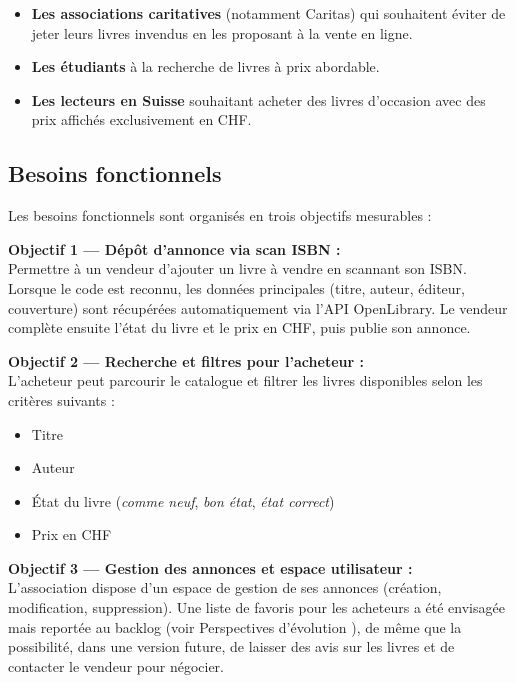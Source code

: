 \documentclass[12pt, a4paper]{report}
\renewcommand{\_}{\origunderscore\allowbreak}
\begin{document}
\begin{itemize}
    \item \textbf{Les associations caritatives} (notamment Caritas) qui souhaitent éviter de jeter leurs livres invendus en les proposant à la vente en ligne.
    \item \textbf{Les étudiants} à la recherche de livres à prix abordable.
    \item \textbf{Les lecteurs en Suisse} souhaitant acheter des livres d'occasion avec des prix affichés exclusivement en CHF.
\end{itemize}

\subsection{Besoins fonctionnels}

Les besoins fonctionnels sont organisés en trois objectifs mesurables :

\vspace{6pt}
\noindent\textbf{Objectif 1 — Dépôt d'annonce via scan ISBN :}\\
Permettre à un vendeur d'ajouter un livre à vendre en scannant son ISBN. Lorsque le code est reconnu, les données principales (titre, auteur, éditeur, couverture) sont récupérées automatiquement via l'API OpenLibrary. Le vendeur complète ensuite l'état du livre et le prix en CHF, puis publie son annonce.

\vspace{6pt}
\noindent\textbf{Objectif 2 — Recherche et filtres pour l'acheteur :}\\
L'acheteur peut parcourir le catalogue et filtrer les livres disponibles selon les critères suivants :
\begin{itemize}
    \item Titre
    \item Auteur
    \item État du livre (\textit{comme neuf}, \textit{bon état}, \textit{état correct})
    \item Prix en CHF
\end{itemize}

\vspace{6pt}
\noindent\textbf{Objectif 3 — Gestion des annonces et espace utilisateur :}\\
L'association dispose d'un espace de gestion de ses annonces (création, modification, suppression). Une liste de favoris pour les acheteurs a été envisagée mais reportée au backlog (voir \og Perspectives d'évolution \fg{}), de même que la possibilité, dans une version future, de laisser des avis sur les livres et de contacter le vendeur pour négocier.
\end{document}
